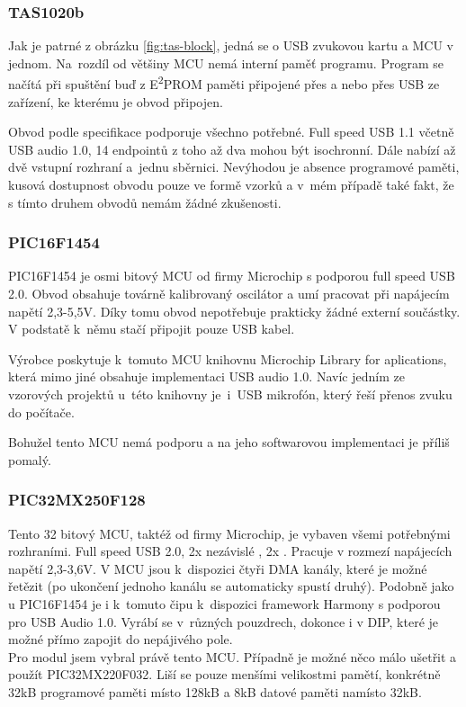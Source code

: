 \subsubsection{TAS1020b}	

Jak je patrné z obrázku \ref{fig:tas-block}, jedná se o USB \iis zvukovou kartu a MCU v jednom. Na~rozdíl od většiny MCU nemá interní paměť programu. Program se načítá při spuštění buď z E\textsuperscript{2}PROM  paměti připojené přes \iic a nebo přes USB ze zařízení, ke kterému je obvod připojen.

Obvod podle specifikace \cite{tas} podporuje všechno potřebné. Full speed USB 1.1 včetně USB audio 1.0, 14 endpointů z toho až dva mohou být isochronní. Dále nabízí až dvě vstupní \iis rozhraní a~jednu \iic sběrnici. Nevýhodou je absence programové paměti, kusová dostupnost obvodu pouze ve formě vzorků a v~mém případě také fakt, že s tímto druhem obvodů nemám žádné zkušenosti.

\subsubsection{PIC16F1454}
PIC16F1454 je osmi bitový MCU od firmy Microchip s podporou full speed USB 2.0. Obvod obsahuje továrně kalibrovaný oscilátor a umí pracovat při napájecím napětí 2,3-5,5V. Díky tomu obvod nepotřebuje prakticky žádné externí součástky. V podstatě k~němu stačí připojit pouze USB kabel.

Výrobce poskytuje k~tomuto MCU knihovnu Microchip Library for aplications, která mimo jiné obsahuje implementaci USB audio 1.0. Navíc jedním ze vzorových projektů u~této knihovny je~i~USB mikrofón, který řeší přenos zvuku do počítače.

Bohužel tento MCU nemá podporu \iis a na jeho softwarovou implementaci je příliš pomalý. 

\subsubsection{PIC32MX250F128}
Tento 32 bitový MCU, taktéž od firmy Microchip, je vybaven všemi potřebnými rozhraními. Full speed USB 2.0, 2x nezávislé \iis, 2x \iic. Pracuje v rozmezí napájecích napětí 2,3-3,6V. V MCU jsou k~dispozici čtyři DMA kanály, které je možné řetězit (po ukončení jednoho kanálu se automaticky spustí druhý). Podobně jako u PIC16F1454 je i k~tomuto čipu k~dispozici framework Harmony \cite{harmony} s podporou pro USB Audio 1.0. Vyrábí se v~různých pouzdrech, dokonce i v DIP, které je možné přímo zapojit do nepájivého pole.\\
Pro modul jsem vybral právě tento MCU. Případně je možné něco málo ušetřit a použít PIC32MX220F032. Liší se pouze menšími velikostmi pamětí, konkrétně 32kB programové paměti místo 128kB a 8kB datové paměti namísto 32kB.

